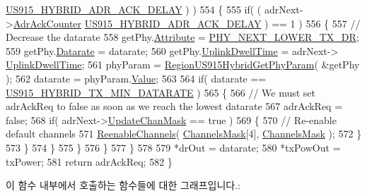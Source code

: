 \begin{DoxyCode}
      \mbox{\hyperlink{group___r_e_g_i_o_n_u_s915_h_y_b_gad0a445c397f7510c7ebdca13b5197389}{US915\_HYBRID\_ADR\_ACK\_DELAY}} ) )
554             \{
555                 \textcolor{keywordflow}{if}( ( adrNext->\mbox{\hyperlink{structs_adr_next_params_a24f0356a3491bf07be9ac99ffa33896a}{AdrAckCounter}} %
      \mbox{\hyperlink{group___r_e_g_i_o_n_u_s915_h_y_b_gad0a445c397f7510c7ebdca13b5197389}{US915\_HYBRID\_ADR\_ACK\_DELAY}} ) == 1 )
556                 \{
557                     \textcolor{comment}{// Decrease the datarate}
558                     getPhy.\mbox{\hyperlink{structs_get_phy_params_abdcb168ffd6913b85e2f635d7a475f2d}{Attribute}} = \mbox{\hyperlink{group___r_e_g_i_o_n_gga51cbe8f5433d914fe9cf81b451de2c2dac002e7e492cf30dbf9c544b062f5cc8a}{PHY\_NEXT\_LOWER\_TX\_DR}};
559                     getPhy.\mbox{\hyperlink{structs_get_phy_params_ae2f6080f3aa0e9485c55513ca56bb24d}{Datarate}} = datarate;
560                     getPhy.\mbox{\hyperlink{structs_get_phy_params_a0e6663762d6f9173bc8d8cb018f8f17a}{UplinkDwellTime}} = adrNext->
      \mbox{\hyperlink{structs_adr_next_params_a0e6663762d6f9173bc8d8cb018f8f17a}{UplinkDwellTime}};
561                     phyParam = \mbox{\hyperlink{group___r_e_g_i_o_n_u_s915_h_y_b_gaf078bd0d293c1a677ca53b7b6ca96c6e}{RegionUS915HybridGetPhyParam}}( &getPhy );
562                     datarate = phyParam.\mbox{\hyperlink{unionu_phy_param_a8e0dcce3428a8051614e852b8836d0d1}{Value}};
563 
564                     \textcolor{keywordflow}{if}( datarate == \mbox{\hyperlink{group___r_e_g_i_o_n_u_s915_h_y_b_ga6c7ab6789cb7bb1a5c1e22833905f787}{US915\_HYBRID\_TX\_MIN\_DATARATE}} )
565                     \{
566                         \textcolor{comment}{// We must set adrAckReq to false as soon as we reach the lowest datarate}
567                         adrAckReq = \textcolor{keyword}{false};
568                         \textcolor{keywordflow}{if}( adrNext->\mbox{\hyperlink{structs_adr_next_params_a708080da9c63d868556b2c48cb53003b}{UpdateChanMask}} == \textcolor{keyword}{true} )
569                         \{
570                             \textcolor{comment}{// Re-enable default channels}
571                             \mbox{\hyperlink{_region_u_s915-_hybrid_8c_ac8aa2da46dca1566e730ffda2650f947}{ReenableChannels}}( \mbox{\hyperlink{_region_u_s915-_hybrid_8c_a2188957b5ca6af8092154d7ccbfa5757}{ChannelsMask}}[4], 
      \mbox{\hyperlink{_region_u_s915-_hybrid_8c_a2188957b5ca6af8092154d7ccbfa5757}{ChannelsMask}} );
572                         \}
573                     \}
574                 \}
575             \}
576         \}
577     \}
578 
579     *drOut = datarate;
580     *txPowOut = txPower;
581     \textcolor{keywordflow}{return} adrAckReq;
582 \}
\end{DoxyCode}
이 함수 내부에서 호출하는 함수들에 대한 그래프입니다.\+:
\mbox{\label{group___r_e_g_i_o_n_u_s915_h_y_b_gac169f8bcedf244520310b47ba0877a0c}} 
